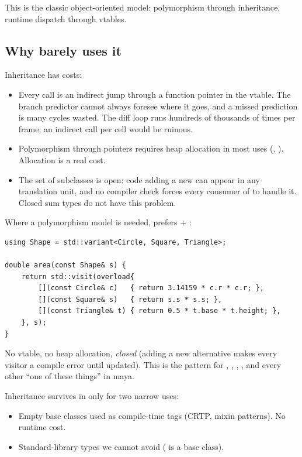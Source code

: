 This is the classic object-oriented model: polymorphism through
inheritance, runtime dispatch through vtables.

\subsection{Why \maya{} barely uses it}

Inheritance has costs:

\begin{itemize}[leftmargin=*]
  \item Every  call is an indirect jump through a
    function pointer in the vtable. The branch predictor cannot
    always foresee where it goes, and a missed prediction is many
    cycles wasted. The diff loop runs hundreds of thousands of
    times per frame; an indirect call per cell would be ruinous.
  \item Polymorphism through pointers requires heap allocation in
    most uses (, ).
    Allocation is a real cost.
  \item The set of subclasses is open: code adding a new 
    can appear in any translation unit, and no compiler check forces
    every consumer of  to handle it. Closed sum types
    do not have this problem.
\end{itemize}

Where a polymorphism model is needed, \maya{} prefers
 + :

\begin{lstlisting}
using Shape = std::variant<Circle, Square, Triangle>;

double area(const Shape& s) {
    return std::visit(overload{
        [](const Circle& c)   { return 3.14159 * c.r * c.r; },
        [](const Square& s)   { return s.s * s.s; },
        [](const Triangle& t) { return 0.5 * t.base * t.height; },
    }, s);
}
\end{lstlisting}

No vtable, no heap allocation, \emph{closed} (adding a new
alternative makes every visitor a compile error until updated). This
is the pattern for , , ,
, and every other ``one of these things'' in maya.

Inheritance survives in \maya{} only for two narrow uses:

\begin{itemize}[leftmargin=*]
  \item Empty base classes used as compile-time tags (CRTP, mixin
    patterns). No runtime cost.
  \item Standard-library types we cannot avoid (
    is a base class).
\end{itemize}

